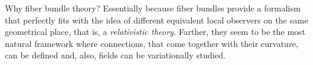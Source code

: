 Why fiber bundle theory? Essentially because fiber bundles provide a formalism that perfectly fits with the idea of different equivalent local observers on the same geometrical place, that is, a \emph{relativistic theory}. Farther, they seem to be the most natural framework where connections, that come together with their curvature, can be defined and, also, fields can be variationally studied.



